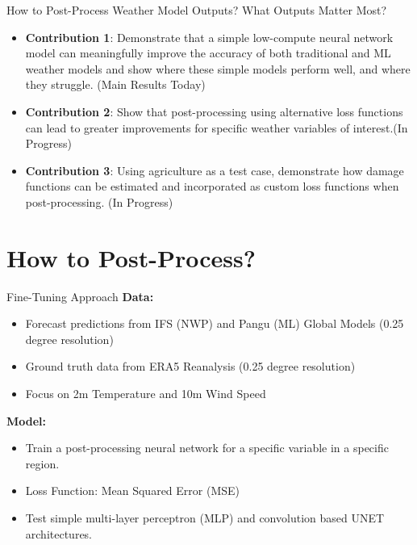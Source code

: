 \documentclass[aspectratio=169, xcolor=dvipsnames]{beamer}
\begin{document}
\begin{frame}{How to Post-Process Weather Model Outputs? What Outputs Matter Most?}

    \begin{itemize}
        \item \textbf{Contribution 1}: Demonstrate that a simple low-compute neural network model can meaningfully improve the accuracy of both traditional and ML weather models and show where these simple models perform well, and where they struggle. (Main Results Today)
        \item \textbf{Contribution 2}: Show that post-processing using alternative loss functions can lead to greater improvements for specific weather variables of interest.(In Progress)
        \item \textbf{Contribution 3}: Using agriculture as a test case, demonstrate how damage functions can be estimated and incorporated as custom loss functions when post-processing. (In Progress)
    \end{itemize}
\end{frame}

\section{How to Post-Process?}


\begin{frame}{Fine-Tuning Approach}
    \hypertarget{FineTuning}{} %
    \textbf{Data:}
    \begin{itemize}
        \item Forecast predictions from IFS (NWP) and Pangu (ML) Global Models (0.25 degree resolution)
        \item Ground truth data from ERA5 Reanalysis (0.25 degree resolution)
        \item Focus on 2m Temperature and 10m Wind Speed
    \end{itemize}

    \textbf{Model:}
    \begin{itemize}
        \item Train a post-processing neural network for a specific variable in a specific region.
        \item Loss Function: Mean Squared Error (MSE)
        \item Test simple multi-layer perceptron (MLP) and convolution based UNET architectures.
    \end{itemize}
\hyperlink{TrainingDetails}{}
\hyperlink{Neural Net Background}{}
\end{frame}
    
\end{document}
